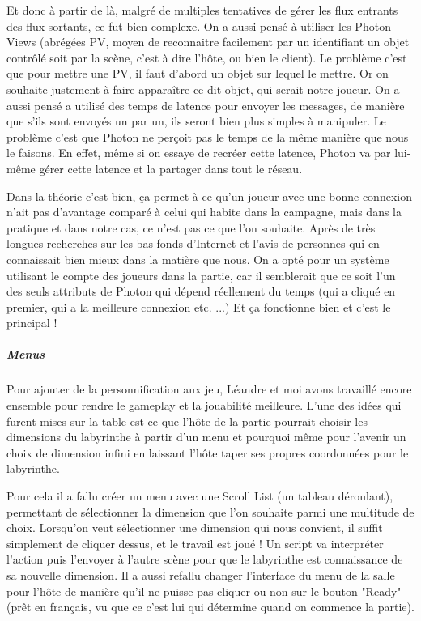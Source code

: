 \documentclass{article}
\begin{document}
Et donc à partir de là, malgré de multiples tentatives de gérer les flux entrants des flux sortants, ce fut bien complexe. On a aussi pensé à utiliser les Photon Views (abrégées PV, moyen de reconnaitre facilement par un identifiant un objet contrôlé soit par la scène, c'est à dire l'hôte, ou bien le client). Le problème c'est que pour mettre une PV, il faut d'abord un objet sur lequel le mettre. Or on souhaite justement à faire apparaître ce dit objet, qui serait notre joueur.   
On a aussi pensé a utilisé des temps de latence pour envoyer les messages, de manière que s'ils sont envoyés un par un, ils seront bien plus simples à manipuler. Le problème c'est que Photon ne perçoit pas le temps de la même manière que nous le faisons. En effet, même si on essaye de recréer cette latence, Photon va par lui-même gérer cette latence et la partager dans tout le réseau. 

Dans la théorie c'est bien, ça permet à ce qu'un joueur avec une bonne connexion n'ait pas d'avantage comparé à celui qui habite dans la campagne, mais dans la pratique et dans notre cas, ce n'est pas ce que l'on souhaite. Après de très longues recherches sur les bas-fonds d'Internet et l'avis de personnes qui en connaissait bien mieux dans la matière que nous. On a opté pour un système utilisant le compte des joueurs dans la partie, car il semblerait que ce soit l'un des seuls attributs de Photon qui dépend réellement du temps (qui a cliqué en premier, qui a la meilleure connexion etc. ...) Et ça fonctionne bien et c'est le principal !


\subparagraph{Menus}

Pour ajouter de la personnification aux jeu, Léandre et moi avons travaillé encore ensemble pour rendre le gameplay et la jouabilité meilleure. L'une des idées qui furent mises sur la table est ce que l'hôte de la partie pourrait choisir les dimensions du labyrinthe à partir d’un menu et pourquoi même pour l'avenir un choix de dimension infini en laissant l'hôte taper ses propres coordonnées pour le labyrinthe. 

Pour cela il a fallu créer un menu avec une Scroll List (un tableau déroulant), permettant de sélectionner la dimension que l'on souhaite parmi une multitude de choix. Lorsqu'on veut sélectionner une dimension qui nous convient, il suffit simplement de cliquer dessus, et le travail est joué ! Un script va interpréter l'action puis l'envoyer à l'autre scène pour que le labyrinthe est connaissance de sa nouvelle dimension. Il a aussi refallu changer l'interface du menu de la salle pour l'hôte de manière qu'il ne puisse pas cliquer ou non sur le bouton "Ready" (prêt en français, vu que ce c'est lui qui détermine quand on commence la partie).
 
\end{document}
